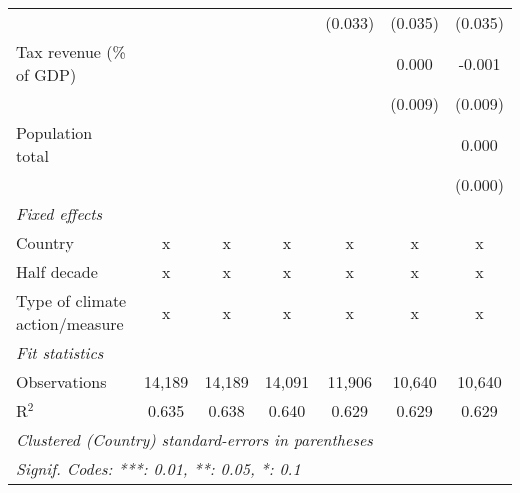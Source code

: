 \begin{tabular}{lcccccc}
                                                             &              &               &              & (0.033)      & (0.035)      & (0.035)\\   
   Tax revenue (\% of GDP)                                   &              &               &              &              & 0.000        & -0.001\\   
                                                             &              &               &              &              & (0.009)      & (0.009)\\   
   Population total                                          &              &               &              &              &              & 0.000\\   
                                                             &              &               &              &              &              & (0.000)\\   
   \emph{Fixed effects}\\
   Country                                                   & x            & x             & x            & x            & x            & x\\  
   Half decade                                               & x            & x             & x            & x            & x            & x\\  
   Type of climate action/measure                            & x            & x             & x            & x            & x            & x\\  
   \midrule \emph{Fit statistics}\\
   Observations                                              & 14,189       & 14,189        & 14,091       & 11,906       & 10,640       & 10,640\\  
   R$^2$                                                     & 0.635        & 0.638         & 0.640        & 0.629        & 0.629        & 0.629\\  
   \midrule
   \multicolumn{7}{l}{\emph{Clustered (Country) standard-errors in parentheses}}\\
   \multicolumn{7}{l}{\emph{Signif. Codes: ***: 0.01, **: 0.05, *: 0.1}}\\
\end{tabular}
\par\endgroup


